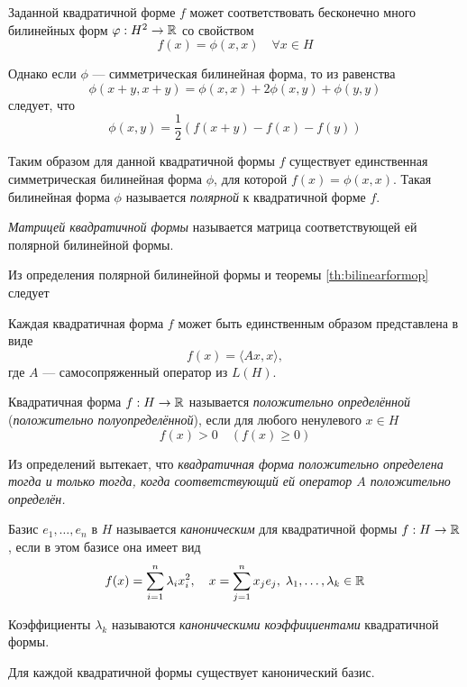 Заданной квадратичной форме $f$ может соответствовать бесконечно много
билинейных форм $\varphi: H^2 \to \mathbb{R}$ со свойством 
\[ f(x) = \phi(x, x) \quad \forall x \in H \]

Однако если $\phi$ --- симметрическая билинейная форма, то из равенства
\[ \phi(x + y, x+y) = \phi(x, x) + 2\phi(x, y) + \phi(y, y) \]
следует, что
\[ \phi(x, y) = \frac{1}{2} (f(x+y) - f(x) - f(y)) \]

Таким образом для данной квадратичной формы $f$ существует единственная
симметрическая билинейная форма $\phi$, для которой $f(x) = \phi(x, x)$. Такая
билинейная форма $\phi$ называется \emph{полярной} к квадратичной форме $f$.

\begin{definition}
    \emph{Матрицей квадратичной формы} называется матрица соответствующей ей полярной
    билинейной формы.
\end{definition}

Из определения полярной билинейной формы и теоремы \ref{th:bilinearformop}
следует

\begin{theorem}
    Каждая квадратичная форма $f$ может быть единственным образом представлена в
    виде
    \[ f(x) = \langle Ax, x\rangle, \]
    где $A$ --- самосопряженный оператор из $L(H)$.
\end{theorem}

\begin{definition}
    Квадратичная форма $f: H \to \mathbb{R}$ называется \emph{положительно
    определённой}
    (\emph{положительно полуопределённой}), если для любого ненулевого $x \in H$
    \[ f(x) > 0 \quad (f(x) \geq 0) \]
\end{definition}

Из определений вытекает, что \emph{квадратичная форма положительно определена
тогда и
только тогда, когда соответствующий ей оператор $A$ положительно определён.}

\begin{definition}
    Базис $e_1, \dotsc, e_n$ в $H$ называется \emph{каноническим} для квадратичной
    формы $f : H \to \mathbb{R}$, если в этом базисе она имеет вид
    \[ f(x) = \sum_{i=1}^n \lambda_i x_i^2, \quad x = \sum_{j=1}^n x_j e_j, \;
    \lambda_1, \dotsc, \lambda_k \in \mathbb{R} \]

    Коэффициенты $\lambda_k$ называются \emph{каноническими коэффициентами}
    квадратичной формы.
\end{definition}

\begin{theorem}
    Для каждой квадратичной формы существует канонический базис.
\end{theorem}

